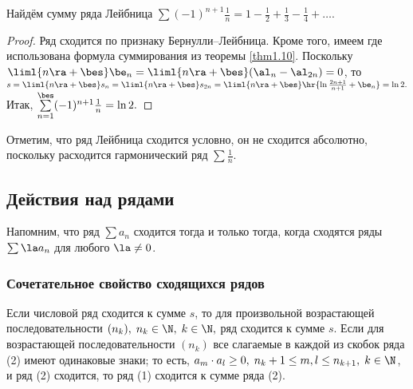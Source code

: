 \documentclass[a4paper]{article}
\begin{document}
\begin{ex}
Найдём сумму ряда Лейбница $\sum (-1)^{n+1} \frac1n = 1-\frac12 +
\frac13 - \frac14 + \ldots.$
\end{ex}

\begin{proof}
Ряд сходится по признаку Бернулли--Лейбница. Кроме того, имеем
 где использована формула суммирования из теоремы
\ref{thm1.10}. Поскольку $\liml{n\ra+\bes} \be_n = \liml{n\ra+\bes}
(\al_n - \al_{2n})=0$, то $s=\liml{n\ra+\bes} s_n = \liml{n\ra+\bes}
s_{2n} = \liml{n\ra+\bes} \hr{\ln\frac{2n+1}{n+1} + \be_n} = \ln2.$
Итак, $\sum\limits_{n=1}^{\bes} (-1)^{n+1} \frac1n = \ln2.$
\end{proof}

Отметим, что ряд Лейбница сходится условно, он не сходится
абсолютно, поскольку расходится гармонический ряд $\sum\frac1n$.

\subsection{Действия над рядами}

Напомним, что ряд $\sum a_n$ сходится тогда и только тогда, когда
сходятся ряды $\sum \la a_n$ для любого $\la\ne0$.

\subsubsection{Сочетательное свойство сходящихся рядов}

\begin{theorem}
Если числовой ряд 
сходится к сумме $s$, то для произвольной возрастающей
последовательности $(n_k), \; n_k\in\N, \; k\in\N,$ ряд
 сходится к сумме
$s$. Если для возрастающей последовательности $(n_k)$ все слагаемые
в каждой из скобок ряда (2) имеют одинаковые знаки; то есть,
$a_m\cdot a_l\ge0, \; n_k+1\le m,l\le n_{k+1}, \; k\in\N$, и ряд (2)
сходится, то ряд (1) сходится к сумме ряда (2).
\end{theorem}
\end{document}
